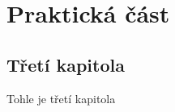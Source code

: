 \part{Praktická část}

\hypertarget{tux159etuxed-kapitola}{%
\chapter{Třetí kapitola}\label{tux159etuxed-kapitola}}

Tohle je třetí kapitola~\parencite{Nespor2005}
